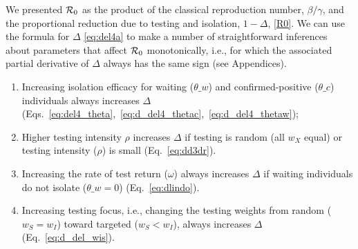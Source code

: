 
We presented $\mathcal{R}_0$ as the product of the classical reproduction number, $\beta/\gamma$, and the proportional reduction due to testing and isolation, $1-\Delta$, \eqref{R0}.
We can use the formula for $\Delta$ \eqref{eq:del4a} to make a number of straightforward inferences about parameters that affect $\mathcal{R}_0$ monotonically, i.e., for which the associated partial derivative of $\Delta$ always has the same sign (see Appendices).

\begin{enumerate}

\item \label{p1:eta} Increasing isolation efficacy for waiting ($\theta\_w$) and confirmed-positive ($\theta\_c$) individuals always increases $\Delta$ (Eqs.~\ref{eq:del4_theta},~\ref{eq:d_del4_thetac},~\ref{eq:d_del4_thetaw});
\item \label{p1:rho} Higher testing intensity $\rho$ increases $\Delta$ if
testing is random (all $w_X$ equal) or testing intensity ($\rho$) is small (Eq.~\ref{eq:dd3dr}).
\item \label{p1:omega} Increasing the rate of test return ($\omega$) always increases $\Delta$ if waiting individuals do not isolate ($\theta\_w=0$) (Eq.~\ref{eq:dlindo}).
\item \label{p1:w} Increasing testing focus, i.e., changing the testing weights from random ($w_S=w_I$) toward targeted  ($w_S<w_I$), always increases $\Delta$ (Eq.~\ref{eq:d_del_wis}).
\end{enumerate}

